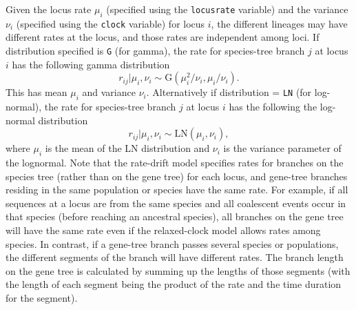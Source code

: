 \documentclass[a4paper]{book}
\numberwithin{equation}{section} \renewcommand{\baselinestretch}{0.55}
\begin{document}
Given the locus rate $\mu_i$ (specified using the \texttt{locusrate}
variable) and the variance $\nu_i$ (specified using the \texttt{clock}
variable) for locus $i$, the different lineages may have different
rates at the locus, and those rates are independent among loci.  If
distribution specified is \texttt{G} (for gamma), the rate for
species-tree branch $j$ at locus $i$ has the following gamma
distribution
\begin{equation}
  r_{ij} | \mu_i, \nu_i \sim \mathrm{G}(\mu_i^2/\nu_i, \mu_i/\nu_i).
\end{equation}
This has mean $\mu_i$ and variance $\nu_i$.  Alternatively if
distribution = \texttt{LN} (for log-normal), the rate for species-tree
branch $j$ at locus $ i $ has the following the log-normal
distribution
\begin{equation}
  r_{ij} | \mu_i, \nu_i \sim \mathrm{LN}(\mu_i, \nu_i),
\end{equation}
where $\mu_i$ is the mean of the LN distribution and $\nu_i$ is the
variance parameter of the lognormal.  Note that the rate-drift model
specifies rates for branches on the species tree (rather than on the
gene tree) for each locus, and gene-tree branches residing in the same
population or species have the same rate.  For example, if all
sequences at a locus are from the same species and all coalescent
events occur in that species (before reaching an ancestral species),
all branches on the gene tree will have the same rate even if the
relaxed-clock model allows rates among species.  In contrast, if a
gene-tree branch passes several species or populations, the different
segments of the branch will have different rates.  The branch length
on the gene tree is calculated by summing up the lengths of those
segments (with the length of each segment being the product of the
rate and the time duration for the segment).
\end{document}
